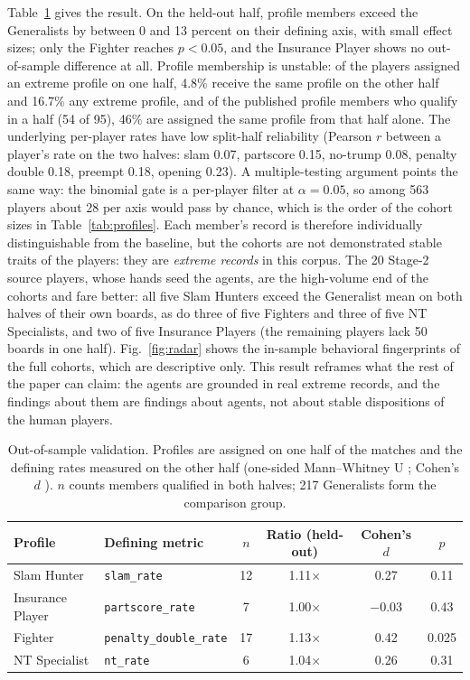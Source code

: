 \documentclass[runningheads]{llncs}
\begin{document}
Table~\ref{tab:cohend} gives the result. On the held-out half, profile
members exceed the Generalists by between 0 and 13 percent on their
defining axis, with small effect sizes; only the Fighter reaches
$p<0.05$, and the Insurance Player shows no out-of-sample difference at
all. Profile membership is unstable: of the players assigned an extreme
profile on one half, 4.8\% receive the same profile on the other half
and 16.7\% any extreme profile, and of the published profile members
who qualify in a half (54 of 95), 46\% are assigned the same profile
from that half alone. The underlying per-player
rates have low split-half reliability (Pearson $r$ between a player's
rate on the two halves: slam 0.07, partscore 0.15, no-trump 0.08,
penalty double 0.18, preempt 0.18, opening 0.23). A multiple-testing
argument points the same way: the binomial gate is a per-player filter
at $\alpha=0.05$, so among 563 players about 28 per axis would pass by
chance, which is the order of the cohort sizes in
Table~\ref{tab:profiles}. Each member's record is therefore
individually distinguishable from the baseline, but the cohorts are not
demonstrated stable traits of the players: they are \emph{extreme
records} in this corpus. The 20 Stage-2 source players, whose hands
seed the agents, are the high-volume end of the cohorts and fare
better: all five Slam Hunters exceed the Generalist mean on both halves
of their own boards, as do three of five Fighters and three of five NT
Specialists, and two of five Insurance Players (the remaining players
lack 50 boards in one half). Fig.~\ref{fig:radar} shows the in-sample
behavioral fingerprints of the full cohorts, which are descriptive
only. This result reframes what the rest of the paper can claim: the
agents are grounded in real extreme records, and the findings about
them are findings about agents, not about stable dispositions of the
human players.

\begin{table}[h]
\centering\small
\caption{Out-of-sample validation. Profiles are assigned on one half of
the matches and the defining rates measured on the other half
(one-sided Mann--Whitney U \cite{mann1947test}; Cohen's $d$
\cite{cohen1988statistical}). $n$ counts members qualified in both
halves; 217 Generalists form the comparison group.}
\label{tab:cohend}
\begin{tabular}{llcccc}
\toprule
Profile & Defining metric & $n$ & Ratio (held-out) & Cohen's $d$ & $p$\\
\midrule
Slam Hunter      & \texttt{slam\_rate}            & 12 & 1.11$\times$ & 0.27 & 0.11\\
Insurance Player & \texttt{partscore\_rate}       &  7 & 1.00$\times$ & $-0.03$ & 0.43\\
Fighter          & \texttt{penalty\_double\_rate} & 17 & 1.13$\times$ & 0.42 & 0.025\\
NT Specialist    & \texttt{nt\_rate}              &  6 & 1.04$\times$ & 0.26 & 0.31\\
\bottomrule
\end{tabular}
\end{table}
\end{document}

